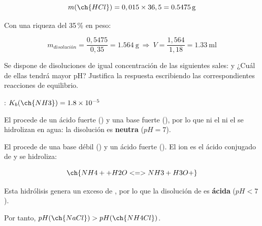 \begin{exerciseEVAU}
\begin{solu}
        \begin{equation*}
            m(\ch{HCl}) = 0,015\times36,5 = \SI{0.5475}{\gram}
        \end{equation*}

        Con una riqueza del 35\,\% en peso:

        \begin{equation*}
            m_{disolución} = \dfrac{0,5475}{0,35} = \SI{1.564}{\gram} \ \Rightarrow \ V = \dfrac{1,564}{1,18} = \SI{1.33}{\milli\litre}
        \end{equation*}

    \end{solu}
\end{exerciseEVAU}

\begin{exerciseEVAU}
    Se dispone de disoluciones de igual concentración de las siguientes sales:  y  ¿Cuál de ellas tendrá mayor pH? Justifica la respuesta escribiendo las correspondientes reacciones de equilibrio.

    \datos{}: \(K_b(\ch{NH3}) = \num{1.8e-5}\)


    \begin{solu}
%

        El  procede de un ácido fuerte () y una base fuerte (), por lo que ni el  ni el  se hidrolizan en agua: la disolución es \textbf{neutra} (\(pH = 7\)).

        El  procede de una base débil () y un ácido fuerte (). El ion  es el ácido conjugado de  y se hidroliza:

        \begin{equation*}
            \ch{NH4+ + H2O <=> NH3 + H3O+}
        \end{equation*}

        Esta hidrólisis genera un exceso de , por lo que la disolución de  es \textbf{ácida} (\(pH < 7\)).

        Por tanto, \( pH(\ch{NaCl}) > pH(\ch{NH4Cl}) \).

    \end{solu}
\end{exerciseEVAU}

